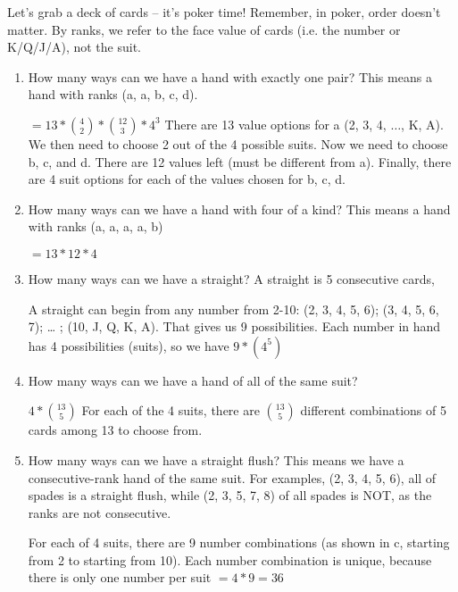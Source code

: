 \question 
Let's grab a deck of cards – it's poker time! Remember, in poker, order doesn’t matter. By ranks, we refer to the face value of cards (i.e. the number or K/Q/J/A), not the suit.
\begin{enumerate}[label=(\alph*)]

\item
How many ways can we have a hand with exactly one pair? This means a hand with ranks (a, a, b, c, d).
	\begin{solution}
	$= 13 * {4 \choose 2} * {12 \choose 3} * 4^3$ 
	There are 13 value options for a (2, 3, 4, $\dots$, K, A). We then need to choose 2 out of the 4 possible suits. Now we need to choose b, c, and d. There are 12 values left (must be different from a). Finally, there are 4 suit options for each of the values chosen for b, c, d.
	\end{solution}

\item How many ways can we have a hand with four of a kind? This means a hand with ranks (a, a, a, a, b)
	\begin{solution} $= 13 * 12 * 4$ \end{solution}

\item How many ways can we have a straight? A straight is 5 consecutive cards, 
	\begin{solution} A straight can begin from any number from 2-10: (2, 3, 4, 5, 6); (3, 4, 5, 6, 7); … ; (10, J, Q, K, A). That gives us 9 possibilities. Each number in hand has 4 possibilities (suits), so we have $9 * (4^5)$ \end{solution}

\item How many ways can we have a hand of all of the same suit? 
	\begin{solution} $4 * {13 \choose 5}$ 
	For each of the 4 suits, there are ${13 \choose 5}$ different combinations of 5 cards among 13 to choose from.
	\end{solution}
	
\item How many ways can we have a straight flush? This means we have a consecutive-rank hand of the same suit. For examples, (2, 3, 4, 5, 6), all of spades is a straight flush, while (2, 3, 5, 7, 8) of all spades is NOT, as the ranks are not consecutive. 
	\begin{solution}
	For each of 4 suits, there are 9 number combinations (as shown in c, starting from 2 to starting from 10). Each number combination is unique, because there is only one number per suit
	$= 4 * 9 = 36$
	\end{solution}

\end{enumerate}